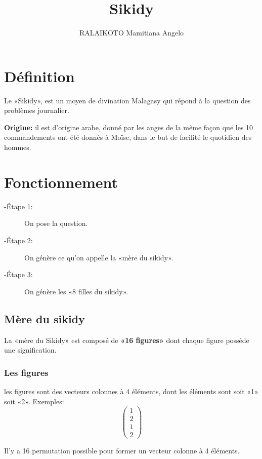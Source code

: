 \documentclass[12pt]{report}
\title{Sikidy}
\author{RALAIKOTO Mamitiana Angelo}
\begin{document}
\maketitle
\section{Définition}
Le «Sikidy», est un moyen de divination Malagasy qui répond à la question des problèmes journalier.\newline

\textbf{Origine:} il est d’origine arabe, donné par les anges de la même façon que les 10 commandements ont été donnés à Moïse, dans le but de facilité le quotidien des hommes.

\section{Fonctionnement}
\begin{description}
\item[-Étape 1:]On pose la question.
\item[-Étape 2:]On génère ce qu’on appelle la «mère du sikidy».
\item[-Étape 3:]On génère les «8 filles du sikidy».
\end{description}

\subsection{Mère du sikidy}
La «mère du Sikidy» est composé de \textbf{«16 figures»} dont chaque figure possède une signification.

\subsubsection{Les figures}
les figures sont des vecteurs colonnes à 4 éléments, dont les éléments sont soit «1» soit «2». 
Exemples:
\[
\begin{pmatrix}
1  \\
2  \\
1  \\
2
\end{pmatrix}
\]

Il'y a 16 permutation possible pour former un vecteur colonne à 4 éléments.
\end{document}
